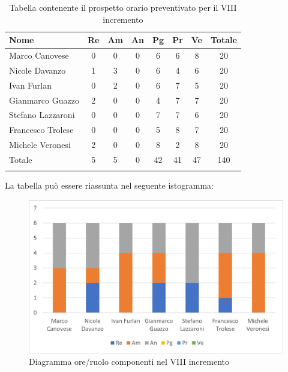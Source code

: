 \begin{longtable}{|l|c|c|c|c|c|c|c|}
	\hline
	\rowcolor{lighter-grayer}
	\textbf{Nome}     & \textbf{Re} & \textbf{Am} & \textbf{An} & \textbf{Pg} & \textbf{Pr} & \textbf{Ve} & \textbf{Totale} \\
	\hline
	\endfirsthead

	\hline
	Marco Canovese    & 0           & 0           & 0           & 6           & 6           & 8           & 20               \\
	\hline
	\hline
	Nicole Davanzo    & 1           & 3           & 0           & 6           & 4           & 6           & 20            \\
	\hline
	\hline
	Ivan Furlan       & 0           & 2           & 0           & 6           & 7           & 5           & 20               \\
	\hline
	\hline
	Gianmarco Guazzo  & 2           & 0           & 0           & 4           & 7           & 7           & 20               \\
	\hline
	\hline
	Stefano Lazzaroni & 0           & 0           & 0           & 7           & 7           & 6           & 20               \\
	\hline
	\hline
	Francesco Trolese & 0           & 0           & 0           & 5           & 8           & 7           & 20               \\
	\hline
	\hline
	Michele Veronesi  & 2           & 0           & 0           & 8           & 2           & 8           & 20               \\
	\hline
	\hline
	Totale            & 5           & 5          & 0          & 42           & 41           & 47           & 140              \\
	\hline
	\rowcolor{white}
	\caption{Tabella contenente il prospetto orario preventivato per il VIII incremento}
\end{longtable}


La tabella può essere riassunta nel seguente istogramma:

\begin{figure}[H]
	\centering
	\includegraphics[width=0.8\linewidth]{res/images/preventivo/dettaglio_analisi/1-1.png}
	\caption{Diagramma ore/ruolo componenti nel VIII incremento}
	\label{fig:diagramma suddivisione ruoli VIII incremento}
\end{figure}

